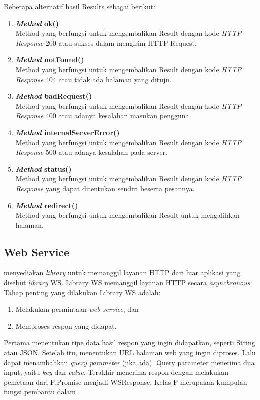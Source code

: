 Beberapa alternatif hasil Results sebagai berikut:
\begin{enumerate}
	\item \textbf{\textit{Method} ok()}\\ 
	Method yang berfungsi untuk mengembalikan Result dengan kode \textit{HTTP Response} 200 atau sukses dalam mengirim HTTP Request.
	\item \textbf{\textit{Method} notFound()}\\
	Method yang berfungsi untuk mengembalikan Result dengan  kode \textit{HTTP Response} 404 atau tidak ada halaman yang dituju.
	\item \textbf{\textit{Method} badRequest()}\\
	Method yang berfungsi untuk mengembalikan Result dengan kode \textit{HTTP Response} 400 atau adanya kesalahan masukan pengguna.
	\item \textbf{\textit{Method} internalServerError()}\\
	Method yang berfungsi untuk mengembalikan Result dengan kode \textit{HTTP Response} 500 atau adanya kesalahan pada server.
	\item \textbf{\textit{Method} status()}\\
	Method yang berfungsi untuk mengembalikan Result dengan kode \textit{HTTP Response} yang dapat ditentukan sendiri beserta pesannya.
	\item \textbf{\textit{Method} redirect()}\\
	Method yang berfungsi untuk mengembalikan Result untuk mengalihkan halaman.
\end{enumerate}

\subsection{Web Service}
\play menyediakan \textit{library} untuk memanggil layanan HTTP dari luar aplikasi \play yang disebut \textit{library} WS. Library WS memanggil layanan HTTP secara \textit{asynchronous}. Tahap penting yang dilakukan Library WS adalah:
\begin{enumerate}
	\item Melakukan permintaan \textit{web service}, dan
	\item Memproses respon yang didapat.
\end{enumerate}

Pertama menentukan tipe data hasil respon yang ingin didapatkan, seperti String atau JSON. Setelah itu, menentukan URL halaman web yang ingin diproses. Lalu dapat menambahkan \textit{query parameter} (jika ada). Query parameter menerima dua input, yaitu \textit{key} dan \textit{value}. Terakhir menerima respon dengan melakukan pemetaan dari F.Promise menjadi WSResponse. Kelas F merupakan kumpulan fungsi pembantu dalam \play.

